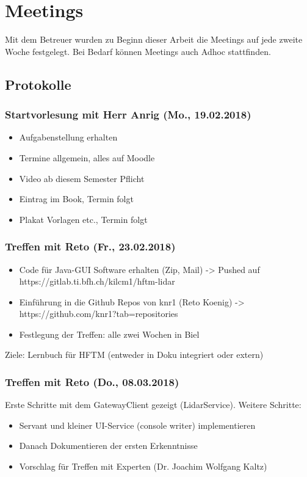 \section{Meetings}
Mit dem Betreuer wurden zu Beginn dieser Arbeit die Meetings auf jede zweite Woche festgelegt. Bei Bedarf können Meetings auch Adhoc stattfinden.
\subsection{Protokolle}
\subsubsection{Startvorlesung mit Herr Anrig (Mo., 19.02.2018)}
\begin{itemize}
	\item Aufgabenstellung erhalten
	\item Termine allgemein, alles auf Moodle
	\item Video ab diesem Semester Pflicht
	\item Eintrag im Book, Termin folgt
	\item Plakat Vorlagen etc., Termin folgt
\end{itemize}

\subsubsection{Treffen mit Reto (Fr., 23.02.2018)}
\begin{itemize}
	\item Code für Java-GUI Software erhalten (Zip, Mail) -> Pushed auf https://gitlab.ti.bfh.ch/kilcm1/hftm-lidar
	\item Einführung in die Github Repos von knr1 (Reto Koenig) -> https://github.com/knr1?tab=repositories
	\item Festlegung der Treffen: alle zwei Wochen in Biel
\end{itemize}
Ziele: Lernbuch für HFTM (entweder in Doku integriert oder extern)


\subsubsection{Treffen mit Reto (Do., 08.03.2018)}
Erste Schritte mit dem GatewayClient gezeigt (LidarService). Weitere Schritte:
\begin{itemize}
	\item Servant und kleiner UI-Service (console writer) implementieren
	\item Danach Dokumentieren der ersten Erkenntnisse
	\item Vorschlag für Treffen mit Experten (Dr. Joachim Wolfgang Kaltz)
\end{itemize}
